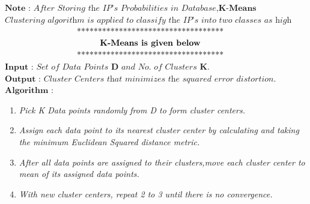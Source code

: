 \documentclass{article}
\begin{document}
\begin{algorithm}
\begin{algorithmic}[1]
\State $\textbf{Note : }\textit{After Storing the IP's Probabilities in Database,}\textbf{K-Means} $ $\textit{Clustering algorithm is applied to classify the IP's into two classes as high and Low.}$
 $\centerline{***********************************}$
 $\textbf{\centerline{K-Means is given below}}$
 $\centerline{***********************************}$
\State $\textbf{Input : }\textit{Set of Data Points }\textbf{D}\textit{ and No. of Clusters}\textbf{ K.}$
\State $\textbf{Output : }\textit{Cluster Centers that minimizes the squared error distortion.}$
\State $\textbf{Algorithm : }$
\begin{enumerate}
   \item \textit{Pick K Data points randomly from D to form cluster centers.}
   \item \textit{Assign each data point to its nearest cluster center by calculating and taking the minimum Euclidean Squared distance metric.}
   \item \textit{After all data points are assigned to their clusters,move each cluster center to mean of its assigned data points.}
   \item \textit{With new cluster centers, repeat 2 to 3 until there is no convergence.}
\end{enumerate}

\end{algorithmic}
\end{algorithm}
\end{document}
